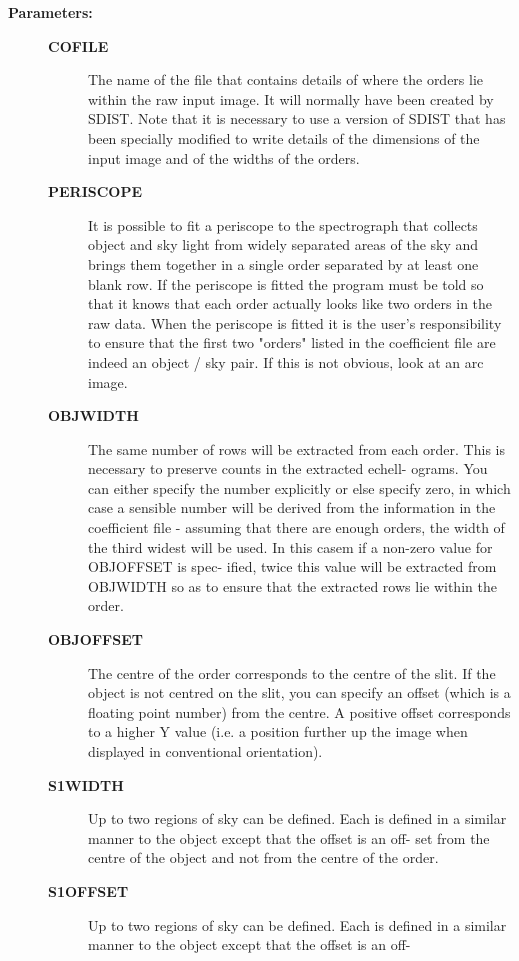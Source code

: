 \begin{description}
\begin{description}
\item [\textbf{Parameters:}]
\begin{description}
\item [\textbf{COFILE}]
 The name of the file that contains details of where the orders
 lie within the raw input image.  It will normally have been
 created by SDIST.  Note that it is necessary to use a version
 of SDIST that has been specially modified to write details of
 the dimensions of the input image and of the widths of the orders.
\item [\textbf{PERISCOPE}]
 It is possible to fit a periscope to the spectrograph that
 collects object and sky light from widely separated areas of
 the sky and brings them together in a single order separated
 by at least one blank row. If the periscope is fitted the
 program must be told so that it knows that each order actually
 looks like two orders in the raw data. When the periscope is
 fitted it is the user's responsibility to ensure that the
 first two "orders" listed in the coefficient file are indeed
 an object / sky pair. If this is not obvious, look at an arc
 image.
\item [\textbf{OBJWIDTH}]
 The same number of rows will be extracted from each order.
 This is necessary to preserve counts in the extracted echell-
 ograms. You can either specify the number explicitly or else
 specify zero, in which case a sensible number will be derived
 from the information in the coefficient file - assuming that
 there are enough orders, the width of the third widest will be
 used. In this casem if a non-zero value for OBJOFFSET is spec-
 ified, twice this value will be extracted from OBJWIDTH so
 as to ensure that the extracted rows lie within the order.
\item [\textbf{OBJOFFSET}]
 The centre of the order corresponds to the centre of the slit.
 If the object is not centred on the slit, you can specify an
 offset (which is a floating point number) from the centre. A
 positive offset corresponds to a higher Y value (i.e. a position
 further up the image when displayed in conventional orientation).
\item [\textbf{S1WIDTH}]
 Up to two regions of sky can be defined. Each is defined in a
 similar manner to the object except that the offset is an off-
 set from the centre of the object and not from the centre of
 the order.
\item [\textbf{S1OFFSET}]
 Up to two regions of sky can be defined. Each is defined in a
 similar manner to the object except that the offset is an off-

\end{description}
\end{description}
\end{description}
